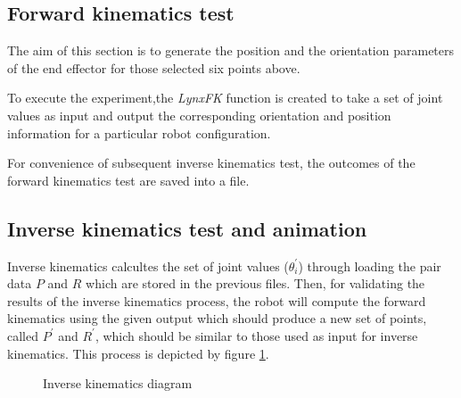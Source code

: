 \documentclass{article}
\begin{document}
\subsection{Forward kinematics test}

The aim of this section is to generate the position and the orientation parameters of the end effector for those selected six points above.

To execute the experiment,the \textit{LynxFK} function is created to take a set of joint values as input and output the corresponding orientation and position information for a particular robot configuration.

For convenience of subsequent inverse kinematics test, the outcomes of the forward kinematics test are saved into a file. 

\subsection{Inverse kinematics test and animation}
Inverse kinematics calcultes the set of joint values ($\theta_i^{\prime}$) through loading the pair data $P$ and $R$ which are stored in the previous files. Then, for validating the results of the inverse kinematics process, the robot will compute the forward kinematics using the given output which should produce a new set of points, called $P^{\prime}$ and $R^{\prime}$, which should be similar to those used as input for inverse kinematics. This process is depicted by figure \ref{fig:inverse_test.diagram}.

\begin{figure}
\begin{center}
\caption{Inverse kinematics diagram}
\label{fig:inverse_test.diagram}
\end{center}
\end{figure}
\end{document}
